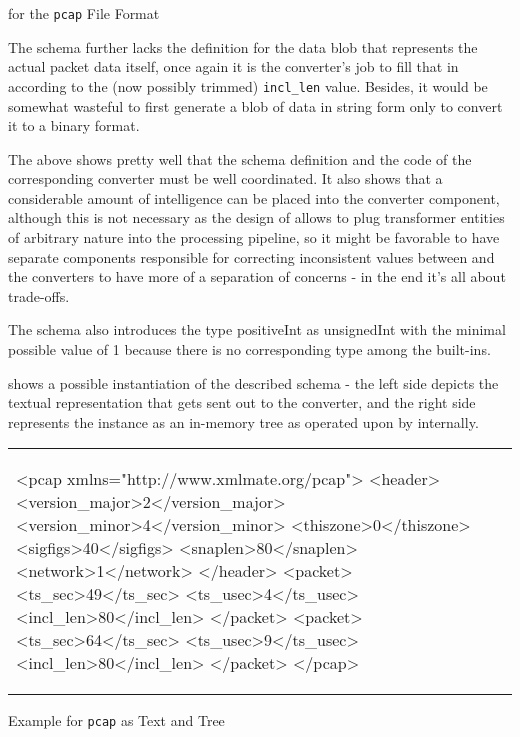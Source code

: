 \begin{listing}[H]
\centering
\inputminted[frame=lines,fontsize=\small]{xml}{../subjects/pcap/schema/pcap.xsd}
\caption{\xsd for the \texttt{pcap} File Format}
\label{lst:xsdexample}
\end{listing}

The schema further lacks the definition for the data blob that represents the actual packet data itself, once
again it is the converter's job to fill that in according to the (now possibly trimmed) \texttt{incl\_len}
value. Besides, it would be somewhat wasteful to first generate a blob of data in string form only to 
convert it to a binary format.

The above shows pretty well that the schema definition and the code of the corresponding converter must be well
coordinated. It also shows that a considerable amount of intelligence can be placed into the converter
component, although this is not necessary as the design of \xmlmate allows to plug transformer entities
of arbitrary nature into the processing pipeline, so it might be favorable to have separate components
responsible for correcting inconsistent values between \xmlmate and the converters to have more of a separation
of concerns - in the end it's all about trade-offs.

The schema also introduces the type positiveInt as unsignedInt with the minimal possible value of 1 because
there is no corresponding type among the \xsd built-ins.

 shows a possible instantiation of the described schema - the left side depicts the
textual representation that gets sent out to the converter, and the right side represents the instance as an
in-memory \xml tree as operated upon by \xmlmate internally.

\begin{listing}[h]
\centering
\begin{tabular}{|m{4.5cm}m{8cm}|}
\begin{xmlcode}
<pcap xmlns="http://www.xmlmate.org/pcap">
	<header>
		<version_major>2</version_major>
		<version_minor>4</version_minor>
		<thiszone>0</thiszone>
		<sigfigs>40</sigfigs>
		<snaplen>80</snaplen>
		<network>1</network>
	</header>
	<packet>
		<ts_sec>49</ts_sec>
		<ts_usec>4</ts_usec>
		<incl_len>80</incl_len>
	</packet>
	<packet>
		<ts_sec>64</ts_sec>
		<ts_usec>9</ts_usec>
		<incl_len>80</incl_len>
	</packet>
</pcap>
\end{xmlcode}
&
\begin{tikzpicture}[grow=right]
\tikzset{level distance=68pt,sibling distance=0pt}
\tikzset{execute at begin node=\strut}
	\Tree [.pcap 
[.packet [.incl\_len 80 ] [.ts\_usec 9 ] [.ts\_sec 64 ] ]
[.packet [.incl\_len 80 ] [.ts\_usec 4 ] [.ts\_sec 49 ] ]
[.header [.network 1 ] [.snaplen 80 ] [.sigfigs 40 ] [.thiszone 0 ] [.version\_minor 4 ] [.version\_major 2 ] ]
]
\end{tikzpicture}
\end{tabular}
\caption{Example \xml for \texttt{pcap} as Text and Tree}
\label{lst:xmlexample}
\end{listing}

